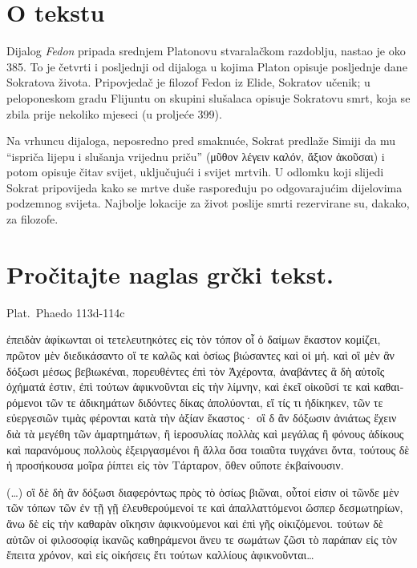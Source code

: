 


\section*{O tekstu}

Dijalog \textit{Fedon} pripada srednjem Platonovu stvaralačkom razdoblju, nastao je oko 385. To je četvrti i posljednji od dijaloga u kojima Platon opisuje posljednje dane Sokratova života. Pripovjedač je filozof Fedon iz Elide, Sokratov učenik; u peloponeskom gradu Flijuntu on skupini slušalaca opisuje Sokratovu smrt, koja se zbila prije nekoliko mjeseci (u proljeće 399).

Na vrhuncu dijaloga, neposredno pred smaknuće, Sokrat predlaže Simiji da mu ``ispriča lijepu i slušanja vrijednu priču'' \textgreek[variant=ancient]{(μῦθον λέγειν καλόν, ἄξιον ἀκοῦσαι)} i potom opisuje čitav svijet, uključujući i svijet mrtvih. U odlomku koji slijedi Sokrat pripovijeda kako se mrtve duše raspoređuju po odgovarajućim dijelovima podzemnog svijeta. Najbolje lokacije za život poslije smrti rezervirane su, dakako, za filozofe.



\section*{Pročitajte naglas grčki tekst.}

Plat.\ Phaedo 113d-114c


\medskip


{\large

\begin{greek}

\noindent ἐπειδὰν ἀφίκωνται οἱ τετελευτηκότες εἰς τὸν τόπον οἷ ὁ δαίμων ἕκαστον κομίζει, πρῶτον μὲν διεδικάσαντο οἵ τε καλῶς καὶ ὁσίως βιώσαντες καὶ οἱ μή. καὶ οἳ μὲν ἂν δόξωσι μέσως βεβιωκέναι, πορευθέντες ἐπὶ τὸν Ἀχέροντα, ἀναβάντες ἃ δὴ αὐτοῖς ὀχήματά ἐστιν, ἐπὶ τούτων ἀφικνοῦνται εἰς τὴν λίμνην, καὶ ἐκεῖ οἰκοῦσί τε καὶ καθαιρόμενοι τῶν τε ἀδικημάτων διδόντες δίκας ἀπολύονται, εἴ τίς τι ἠδίκηκεν, τῶν τε εὐεργεσιῶν τιμὰς φέρονται κατὰ τὴν ἀξίαν ἕκαστος· οἳ δ ἂν δόξωσιν ἀνιάτως ἔχειν διὰ τὰ μεγέθη τῶν ἁμαρτημάτων, ἢ ἱεροσυλίας πολλὰς καὶ μεγάλας ἢ φόνους ἀδίκους καὶ παρανόμους πολλοὺς ἐξειργασμένοι ἢ ἄλλα ὅσα τοιαῦτα τυγχάνει ὄντα, τούτους δὲ ἡ προσήκουσα μοῖρα ῥίπτει εἰς τὸν Τάρταρον, ὅθεν οὔποτε ἐκβαίνουσιν.

\noindent (\dots) οἳ δὲ δὴ ἂν δόξωσι διαφερόντως πρὸς τὸ ὁσίως βιῶναι, οὗτοί εἰσιν οἱ τῶνδε μὲν τῶν τόπων τῶν ἐν τῇ γῇ ἐλευθερούμενοί τε καὶ ἀπαλλαττόμενοι ὥσπερ δεσμωτηρίων, ἄνω δὲ εἰς τὴν καθαρὰν οἴκησιν ἀφικνούμενοι καὶ ἐπὶ γῆς οἰκιζόμενοι. τούτων δὲ αὐτῶν οἱ φιλοσοφίᾳ ἱκανῶς καθηράμενοι ἄνευ τε σωμάτων ζῶσι τὸ παράπαν εἰς τὸν ἔπειτα χρόνον, καὶ εἰς οἰκήσεις ἔτι τούτων καλλίους ἀφικνοῦνται\dots

\end{greek}

}


